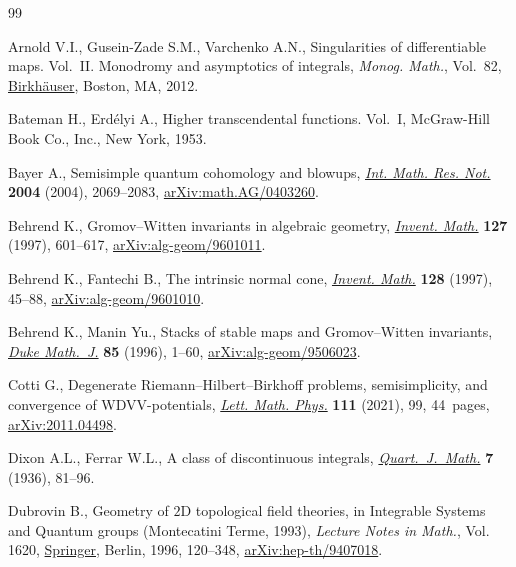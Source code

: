 \documentclass[pdftex]{sigma}
\numberwithin{equation}{section}
\begin{document}
\begin{thebibliography}{99}
\footnotesize\itemsep=0pt

Arnold V.I., Gusein-Zade S.M., Varchenko A.N., Singularities of differentiable
 maps. {V}ol.~{II}. {M}onodromy and asymptotics of integrals, \textit{Monog.
 Math.}, Vol.~82, \href{https://doi.org/10.1007/978-0-8176-8343-6}{Birkh\"auser}, Boston, MA, 2012.

Bateman H., Erd\'elyi A., Higher transcendental functions. {V}ol.~{I},
 McGraw-Hill Book Co., Inc., New York, 1953.

Bayer A., Semisimple quantum cohomology and blowups, \href{https://doi.org/10.1155/S1073792804140907}{\textit{Int. Math. Res.
 Not.}} \textbf{2004} (2004), 2069--2083, \href{https://arxiv.org/abs/math.AG/0403260}{arXiv:math.AG/0403260}.

Behrend K., Gromov--{W}itten invariants in algebraic geometry, \href{https://doi.org/10.1007/s002220050132}{\textit{Invent.
 Math.}} \textbf{127} (1997), 601--617, \href{https://arxiv.org/abs/alg-geom/9601011}{arXiv:alg-geom/9601011}.

Behrend K., Fantechi B., The intrinsic normal cone, \href{https://doi.org/10.1007/s002220050136}{\textit{Invent. Math.}}
 \textbf{128} (1997), 45--88, \href{https://arxiv.org/abs/alg-geom/9601010}{arXiv:alg-geom/9601010}.

Behrend K., Manin Yu., Stacks of stable maps and {G}romov--{W}itten invariants,
 \href{https://doi.org/10.1215/S0012-7094-96-08501-4}{\textit{Duke Math.~J.}} \textbf{85} (1996), 1--60, \href{https://arxiv.org/abs/alg-geom/9506023}{arXiv:alg-geom/9506023}.

Cotti G., Degenerate {R}iemann--{H}ilbert--{B}irkhoff problems, semisimplicity,
 and convergence of {WDVV}-potentials, \href{https://doi.org/10.1007/s11005-021-01427-9}{\textit{Lett. Math. Phys.}} \textbf{111}
 (2021), 99, 44~pages, \href{https://arxiv.org/abs/2011.04498}{arXiv:2011.04498}.

Dixon A.L., Ferrar W.L., A class of discontinuous integrals,
 \href{https://doi.org/10.1093/qmath/os-7.1.81}{\textit{Quart.~J.~Math.}} \textbf{7} (1936), 81--96.

Dubrovin B., Geometry of {$2$}{D} topological field theories, in Integrable
 {S}ystems and {Q}uantum groups ({M}ontecatini {T}erme, 1993), \textit{Lecture
 Notes in Math.}, Vol. 1620, \href{https://doi.org/10.1007/BFb0094793}{Springer}, Berlin, 1996, 120--348,
 \href{https://arxiv.org/abs/hep-th/9407018}{arXiv:hep-th/9407018}.


\end{thebibliography}
\end{document}
